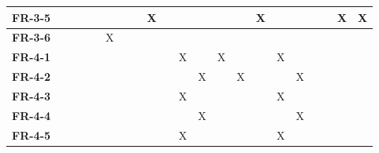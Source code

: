 \documentclass[12pt]{article}
\begin{document}
\begin{table}[H]
{\begin{tabular}{c|c|c|c|c|c|c|c|c|c|c|c|c|c|c|c|c|c|c|c|c|}
  \multicolumn{1}{|l|}{\textbf{FR-3-5}}  &              &              &              &              &              &              &              &       X      &              &              &              &              &              &       X      &              &              &              &              &       X      &       X      \\ \hline
  \multicolumn{1}{|l|}{\textbf{FR-3-6}}  &              &              &              &              &       X      &              &              &              &              &              &              &              &              &              &              &              &              &              &              &              \\ \hline
  \multicolumn{1}{|l|}{\textbf{FR-4-1}}  &              &              &              &              &              &              &              &              &              &       X      &              &       X      &              &              &       X      &              &              &              &              &              \\ \hline
  \multicolumn{1}{|l|}{\textbf{FR-4-2}}  &              &              &              &              &              &              &              &              &              &              &       X      &              &       X      &              &              &       X      &              &              &              &              \\ \hline
  \multicolumn{1}{|l|}{\textbf{FR-4-3}}  &              &              &              &              &              &              &              &              &              &       X      &              &              &              &              &       X      &              &              &              &              &              \\ \hline
  \multicolumn{1}{|l|}{\textbf{FR-4-4}}  &              &              &              &              &              &              &              &              &              &              &       X      &              &              &              &              &       X      &              &              &              &              \\ \hline
  \multicolumn{1}{|l|}{\textbf{FR-4-5}}  &              &              &              &              &              &              &              &              &              &       X      &              &              &              &              &       X      &              &              &              &              &              \\ \hline

\end{tabular}}
\end{table}
\end{document}

